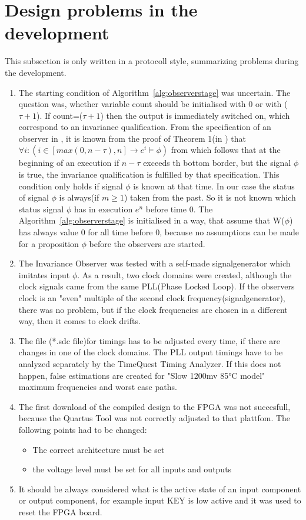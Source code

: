 \section{Design problems in the development}
\label{chapter:3:section:3}
This subsection is only written in a protocoll style, summarizing problems during the development. 
\begin{enumerate}
\item The starting condition of Algorithm~\ref{alg:observerstage} was uncertain. 
The question was, whether variable count should be initialised with 0 or with ($\tau + 1$). 
If count=($\tau + 1$) then the output is immediately switched on, which correspond to an invariance qualification. 
From the specification of an observer in \cite{RTFMBJ13},  
it is known from the proof of Theorem 1(in \cite{RTFMBJ13}) that $\forall i:(i \in [max(0,n-\tau),n] \rightarrow e^i \models \phi)$ from which follows 
that at the beginning of an execution if $n-\tau$ exceeds th bottom border, but the signal $\phi$ is true, the invariance qualification is fulfilled by that specification. 
This condition only holds if signal $\phi$ is known at that time.
In our case the status of signal $\phi$ is always(if $m \ge 1$) taken from the past. 
So it is not known which status signal $\phi$ has in execution $e^n$ before time $0$.
The  Algorithm~\ref{alg:observerstage} is initialised in a way, that assume that W($\phi$) has always value 0 for all time before $0$, 
because no assumptions can be made for a proposition $\phi$ before the observers are started.
\item The Invariance Observer was tested with a  self-made signalgenerator which imitates input $\phi$. 
As a result, two clock domains were created, although the clock signals
came from the same PLL(Phase Locked Loop). 
If the observers clock is an "even" multiple of the second clock frequency(signalgenerator), there was no problem, 
but if the clock frequencies are chosen in a different way, then it comes to clock drifts. 
\item The file (*.sdc file)for timings has to be adjusted every time, if there are changes in one of the clock domains. The PLL output timings have to be analyzed separately by the
TimeQuest Timing Analyzer. If this does not happen, false estimations are created for "Slow 1200mv 85°C model" maximum frequencies and worst case paths. 
\item The first download of the compiled design to the FPGA was not succesfull, because the Quartus Tool was not correctly adjusted to that plattfom. 
The following points had to be changed:
\begin{itemize}
\item The correct architecture must be set
\item the voltage level must be set for all inputs and outputs
\end{itemize}
\item It should be always considered what is the active state of an input component or output component, for example
input KEY is low active and it was used to reset the FPGA board. 
\end{enumerate} 
